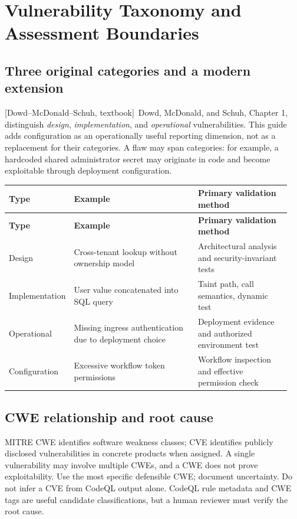 \documentclass[11pt,letterpaper,oneside]{book}
\newcommand{\srcD}{\textsf{[Dowd--McDonald--Schuh, textbook]}}
\begin{document}
\chapter{Vulnerability Taxonomy and Assessment Boundaries}

\section{Three original categories and a modern extension}

\srcD\ Dowd, McDonald, and Schuh, Chapter 1, distinguish \emph{design}, \emph{implementation}, and \emph{operational} vulnerabilities. This guide adds configuration as an operationally useful reporting dimension, not as a replacement for their categories. A flaw may span categories: for example, a hardcoded shared administrator secret may originate in code and become exploitable through deployment configuration.

\small
\setlength{\tabcolsep}{2pt}
\renewcommand{\arraystretch}{1.18}
\begin{longtable}{>{\raggedright\arraybackslash}p{0.18\linewidth}>{\raggedright\arraybackslash}p{0.44\linewidth}>{\raggedright\arraybackslash}p{0.33\linewidth}}
\toprule
\textbf{Type} & \textbf{Example} & \textbf{Primary validation method}\\
\midrule
\endfirsthead
\toprule
\textbf{Type} & \textbf{Example} & \textbf{Primary validation method}\\
\midrule
\endhead
Design & Cross-tenant lookup without ownership model & Architectural analysis and security-invariant tests\\
Implementation & User value concatenated into SQL query & Taint path, call semantics, dynamic test\\
Operational & Missing ingress authentication due to deployment choice & Deployment evidence and authorized environment test\\
Configuration & Excessive workflow token permissions & Workflow inspection and effective permission check\\
\bottomrule
\end{longtable}
\normalsize

\section{CWE relationship and root cause}

MITRE CWE identifies software weakness classes; CVE identifies publicly disclosed vulnerabilities in concrete products when assigned. A single vulnerability may involve multiple CWEs, and a CWE does not prove exploitability. Use the most specific defensible CWE; document uncertainty. Do not infer a CVE from CodeQL output alone. CodeQL rule metadata and CWE tags are useful candidate classifications, but a human reviewer must verify the root cause.
\end{document}
